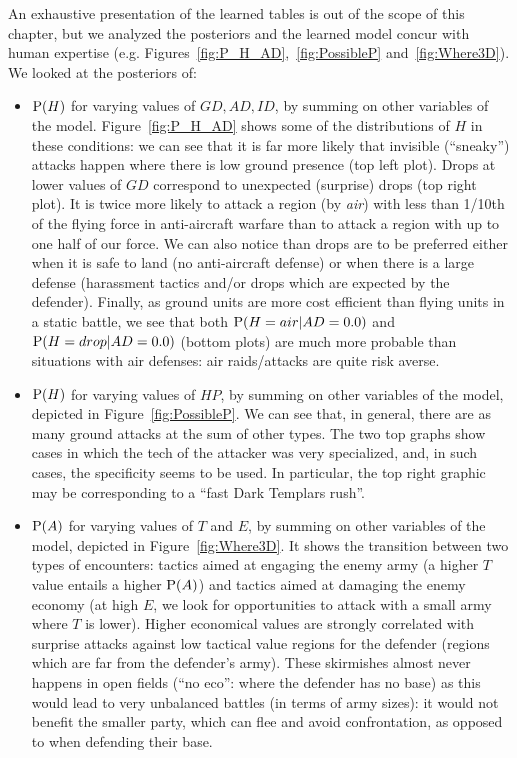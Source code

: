 An exhaustive presentation of the learned tables is out of the scope of this chapter, but we analyzed the posteriors and the learned model concur with human expertise (e.g. Figures~\ref{fig:P_H_AD},~\ref{fig:PossibleP} and~\ref{fig:Where3D}). We looked at the posteriors of:
\begin{itemize}
    \item $\mathrm{P}(H)$ for varying values of $GD,AD,ID$, by summing on other variables of the model. Figure~\ref{fig:P_H_AD} shows some of the distributions of $H$ in these conditions: we can see that it is far more likely that invisible (``sneaky'') attacks happen where there is low ground presence (top left plot). 
Drops at lower values of $GD$ correspond to unexpected (surprise) drops (top right plot). It is twice more likely to attack a region (by \textit{air}) with less than 1/10th of the flying force in anti-aircraft warfare than to attack a region with up to one half of our force. We can also notice than drops are to be preferred either when it is safe to land (no anti-aircraft defense) or when there is a large defense (harassment tactics and/or drops which are expected by the defender). 
Finally, as ground units are more cost efficient than flying units in a static battle, we see that both $\mathrm{P}(H=air|AD=0.0)$ and $\mathrm{P}(H=drop|AD=0.0)$ (bottom plots) are much more probable than situations with air defenses: air raids/attacks are quite risk averse. 


    \item $\mathrm{P}(H)$ for varying values of $HP$, by summing on other variables of the model, depicted in Figure~\ref{fig:PossibleP}. 
We can see that, in general, there are as many ground attacks at the sum of other types. The two top graphs show cases in which the tech of the attacker was very specialized, and, in such cases, the specificity seems to be used. In particular, the top right graphic may be corresponding to a ``fast Dark Templars rush''. 

    \item $\mathrm{P}(A)$ for varying values of $T$ and $E$, by summing on other variables of the model, depicted in Figure~\ref{fig:Where3D}. 
It shows the transition between two types of encounters: tactics aimed at engaging the enemy army (a higher $T$ value entails a higher $\mathrm{P}(A)$) and tactics aimed at damaging the enemy economy (at high $E$, we look for opportunities to attack with a small army where $T$ is lower). Higher economical values are strongly correlated with surprise attacks against low tactical value regions for the defender (regions which are far from the defender's army). These skirmishes almost never happens in open fields (``no eco'': where the defender has no base) as this would lead to very unbalanced battles (in terms of army sizes): it would not benefit the smaller party, which can flee and avoid confrontation, as opposed to when defending their base.
\end{itemize}

